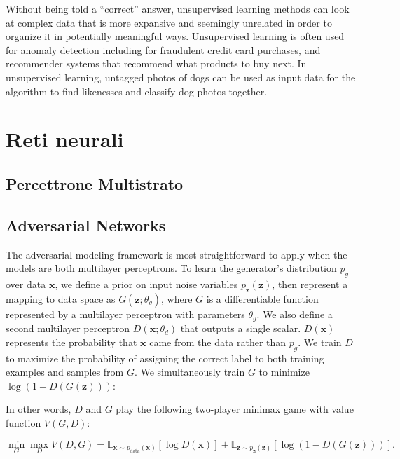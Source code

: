 Without being told a “correct” answer, unsupervised learning methods can look at complex data that is more expansive and seemingly unrelated in order to organize it in potentially meaningful ways. Unsupervised learning is often used for anomaly detection including for fraudulent credit card purchases, and recommender systems that recommend what products to buy next. In unsupervised learning, untagged photos of dogs can be used as input data for the algorithm to find likenesses and classify dog photos together.


\newpage
\section{Reti neurali}

\subsection{Percettrone Multistrato}
\subsection{Adversarial Networks}
The adversarial modeling framework is most straightforward to apply when the models are both multilayer perceptrons. To learn the generator's distribution $p_g$ over data $\bm{x}$, we
define a prior on input noise variables $p_{\bm{z}}(\bm{z})$, then represent a
mapping to data space as $G(\bm{z}; \theta_g)$, where $G$ is a differentiable function
represented by a multilayer perceptron with parameters $\theta_g$. We also define a second
multilayer perceptron $D(\bm{x}; \theta_d)$ that outputs a single scalar. $D(\bm{x})$ represents
the probability that $\bm{x}$ came from the data rather than $p_g$. We train $D$ to maximize the
probability of assigning the correct label to both training examples and samples from $G$.
We simultaneously train $G$ to minimize $\log(1-D(G(\bm{z})))$:

In other words, $D$ and $G$ play the following two-player minimax game with value function $V(G, D)$: 

\begin{equation}
\label{eq:minimaxgame-definition}
\min_G \max_D V(D, G) = \mathbb{E}_{\bm{x} \sim p_{\text{data}}(\bm{x})}[\log D(\bm{x})] + \mathbb{E}_{\bm{z} \sim p_{\bm{z}}(\bm{z})}[\log (1 - D(G(\bm{z})))].
\end{equation}

